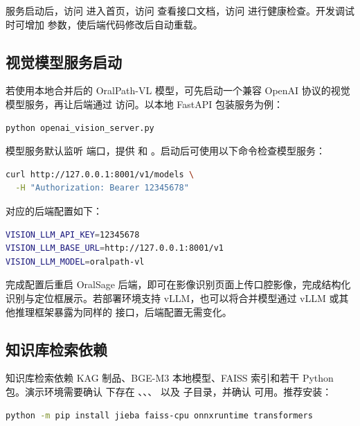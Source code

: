 服务启动后，访问  进入首页，访问  查看接口文档，访问  进行健康检查。开发调试时可增加  参数，使后端代码修改后自动重载。


\subsection{视觉模型服务启动}

若使用本地合并后的 OralPath-VL 模型，可先启动一个兼容 OpenAI 协议的视觉模型服务，再让后端通过  访问。以本地 FastAPI 包装服务为例：

\begin{lstlisting}[language=bash,caption={本地视觉模型服务启动示例},label={lst:vision-model-start}]
python openai_vision_server.py
\end{lstlisting}

模型服务默认监听  端口，提供  和 。启动后可使用以下命令检查模型服务：

\begin{lstlisting}[language=bash]
curl http://127.0.0.1:8001/v1/models \
  -H "Authorization: Bearer 12345678"
\end{lstlisting}

对应的后端配置如下：

\begin{lstlisting}[language=bash]
VISION_LLM_API_KEY=12345678
VISION_LLM_BASE_URL=http://127.0.0.1:8001/v1
VISION_LLM_MODEL=oralpath-vl
\end{lstlisting}

完成配置后重启 OralSage 后端，即可在影像识别页面上传口腔影像，完成结构化识别与定位框展示。若部署环境支持 vLLM，也可以将合并模型通过 vLLM 或其他推理框架暴露为同样的  接口，后端配置无需变化。

\subsection{知识库检索依赖}

知识库检索依赖 KAG 制品、BGE-M3 本地模型、FAISS 索引和若干 Python 包。演示环境需要确认  下存在 、、、 以及  子目录，并确认  可用。推荐安装：

\begin{lstlisting}[language=bash]
python -m pip install jieba faiss-cpu onnxruntime transformers
\end{lstlisting}

